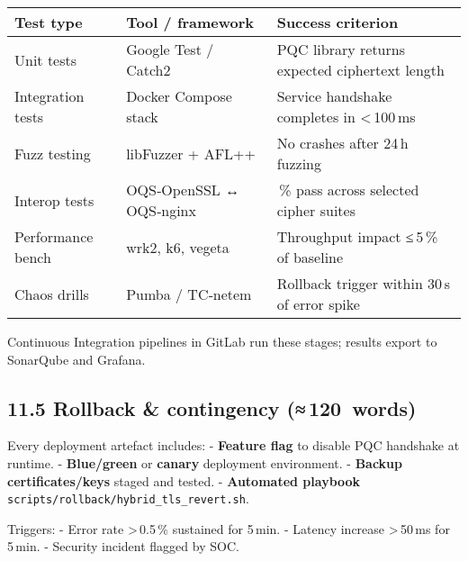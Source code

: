 \documentclass[
  english,
]{article}
\begin{document}
\begin{longtable}[]{@{}
  >{\raggedright\arraybackslash}p{}
  >{\raggedright\arraybackslash}p{}
  >{\raggedright\arraybackslash}p{}@{}}
\toprule\noalign{}
\begin{minipage}[b]{\linewidth}\raggedright
Test type
\end{minipage} & \begin{minipage}[b]{\linewidth}\raggedright
Tool / framework
\end{minipage} & \begin{minipage}[b]{\linewidth}\raggedright
Success criterion
\end{minipage} \\
\midrule\noalign{}
\endhead
\bottomrule\noalign{}
\endlastfoot
Unit tests & Google Test / Catch2 & PQC library returns expected
ciphertext length \\
Integration tests & Docker Compose stack & Service handshake completes
in \textless\,100\,ms \\
Fuzz testing & libFuzzer + AFL++ & No crashes after 24\,h fuzzing \\
Interop tests & OQS‑OpenSSL ↔ OQS‑nginx & 100\,\% pass across selected
cipher suites \\
Performance bench & wrk2, k6, vegeta & Throughput impact ≤\,5\,\% of
baseline \\
Chaos drills & Pumba / TC‑netem & Rollback trigger within 30\,s of error
spike \\
\end{longtable}

Continuous Integration pipelines in GitLab run these stages; results
export to SonarQube and Grafana.

\subsection{11.5 Rollback \& contingency
(≈\,120~words)}\label{rollback-contingency-120-words}

Every deployment artefact includes: - \textbf{Feature flag} to disable
PQC handshake at runtime. - \textbf{Blue/green} or \textbf{canary}
deployment environment. - \textbf{Backup certificates/keys} staged and
tested. - \textbf{Automated playbook}
\texttt{scripts/rollback/hybrid\_tls\_revert.sh}.

Triggers: - Error rate \textgreater\,0.5\,\% sustained for 5\,min. -
Latency increase \textgreater\,50\,ms for 5\,min. - Security incident
flagged by SOC.
\end{document}
